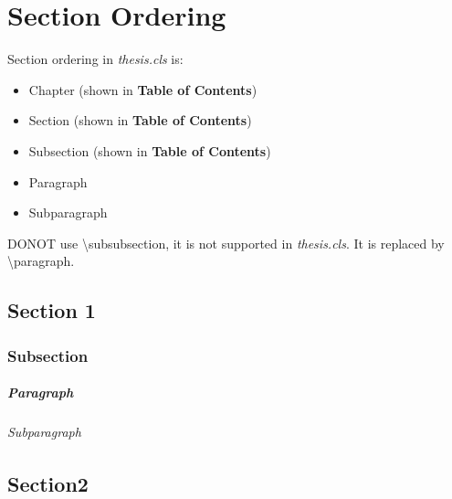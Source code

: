 \chapter{Section Ordering}
\label{chapter:secorder}

Section ordering in \textit{thesis.cls} is:
\begin{itemize}
\item Chapter (shown in \textbf{Table of Contents})
\item Section (shown in \textbf{Table of Contents})
\item Subsection (shown in \textbf{Table of Contents})
\item Paragraph
\item Subparagraph
\end{itemize}
DONOT use \textbackslash subsubsection, it is not supported in \textit{thesis.cls}.
It is replaced by \textbackslash paragraph.

\section{Section 1}
\label{sec:secorder1}
\lipsum[1-2]  %

\subsection{Subsection}
\label{subsec:secorder}
\lipsum[3-4]  %

\paragraph{Paragraph}
\lipsum[5-6]  %

\subparagraph{Subparagraph}
\lipsum[7]  %

\section{Section2}
\label{sec:secorder2}
\lipsum[8]  %
